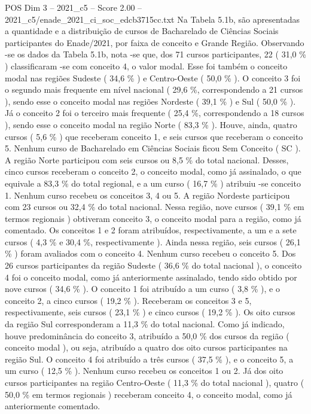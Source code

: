 \begin{textsample}{POS Dim 3 – 2021\_c5 – Score 2.00 – 2021\_c5/enade\_2021\_ci\_soc\_edcb3715cc.txt}
Na Tabela 5.1b, são apresentadas a quantidade e a distribuição de cursos de Bacharelado de Ciências Sociais participantes do Enade/2021, por faixa de conceito e Grande Região.
Observando -se os dados da Tabela 5.1b, nota -se que, dos 71 cursos participantes, 22 ( 31,0 \% ) classificaram -se com conceito 4, o valor modal.
Esse foi também o conceito modal nas regiões Sudeste ( 34,6 \% ) e Centro-Oeste ( 50,0 \% ).
O conceito 3 foi o segundo mais frequente em nível nacional ( 29,6 \%, correspondendo a 21 cursos ), sendo esse o conceito modal nas regiões Nordeste ( 39,1 \% ) e Sul ( 50,0 \% ).
Já o conceito 2 foi o terceiro mais frequente ( 25,4 \%, correspondendo a 18 cursos ), sendo esse o conceito modal na região Norte ( 83,3 \% ).
Houve, ainda, quatro cursos ( 5,6 \% ) que receberam conceito 1, e seis cursos que receberam o conceito 5.
Nenhum curso de Bacharelado em Ciências Sociais ficou Sem Conceito ( SC ).
A região Norte participou com seis cursos ou 8,5 \% do total nacional.
Desses, cinco cursos receberam o conceito 2, o conceito modal, como já assinalado, o que equivale a 83,3 \% do total regional, e a um curso ( 16,7 \% ) atribuiu -se conceito 1.
Nenhum curso recebeu os conceitos 3, 4 ou 5.
A região Nordeste participou com 23 cursos ou 32,4 \% do total nacional.
Nessa região, nove cursos ( 39,1 \% em termos regionais ) obtiveram conceito 3, o conceito modal para a região, como já comentado.
Os conceitos 1 e 2 foram atribuídos, respectivamente, a um e a sete cursos ( 4,3 \% e 30,4 \%, respectivamente ).
Ainda nessa região, seis cursos ( 26,1 \% ) foram avaliados com o conceito 4.
Nenhum curso recebeu o conceito 5.
Dos 26 cursos participantes da região Sudeste ( 36,6 \% do total nacional ), o conceito 4 foi o conceito modal, como já anteriormente assinalado, tendo sido obtido por nove cursos ( 34,6 \% ).
O conceito 1 foi atribuído a um curso ( 3,8 \% ), e o conceito 2, a cinco cursos ( 19,2 \% ).
Receberam os conceitos 3 e 5, respectivamente, seis cursos ( 23,1 \% ) e cinco cursos ( 19,2 \% ).
Os oito cursos da região Sul corresponderam a 11,3 \% do total nacional.
Como já indicado, houve predominância do conceito 3, atribuído a 50,0 \% dos cursos da região ( conceito modal ), ou seja, atribuído a quatro dos oito cursos participantes na região Sul.
O conceito 4 foi atribuído a três cursos ( 37,5 \% ), e o conceito 5, a um curso ( 12,5 \% ).
Nenhum curso recebeu os conceitos 1 ou 2.
Já dos oito cursos participantes na região Centro-Oeste ( 11,3 \% do total nacional ), quatro ( 50,0 \% em termos regionais ) receberam conceito 4, o conceito modal, como já anteriormente comentado.

\end{textsample}
